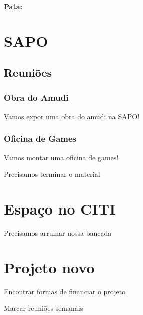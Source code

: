 \documentclass[11pt]{meetingmins}
\begin{document}
\maketitle

\renewcommand{\contentsname}{\Large{Ponteiros:}}
\setcounter{tocdepth}{1}
\tableofcontents

\vspace{30 pt}
\raggedright
\textbf{\Large{Pata:}}

\section{SAPO}

\subsection{Reuniões}
\subsubsection{Obra do Amudi}

Vamos expor uma obra do amudi na SAPO! 

\subsubsection{Oficina de Games}
\begin{items}
\item 
Vamos montar uma oficina de games!
\item
Precisamos terminar o material

\end{items}

\section{Espaço no CITI}
\begin{items}
\item Precisamos arrumar nossa bancada
\end{items}

\section{Projeto novo}
\begin{items}
\item
Encontrar formas de financiar o projeto

\item
Marcar reuniões semanais
\end{items}

\vspace{1em}
\end{document}
